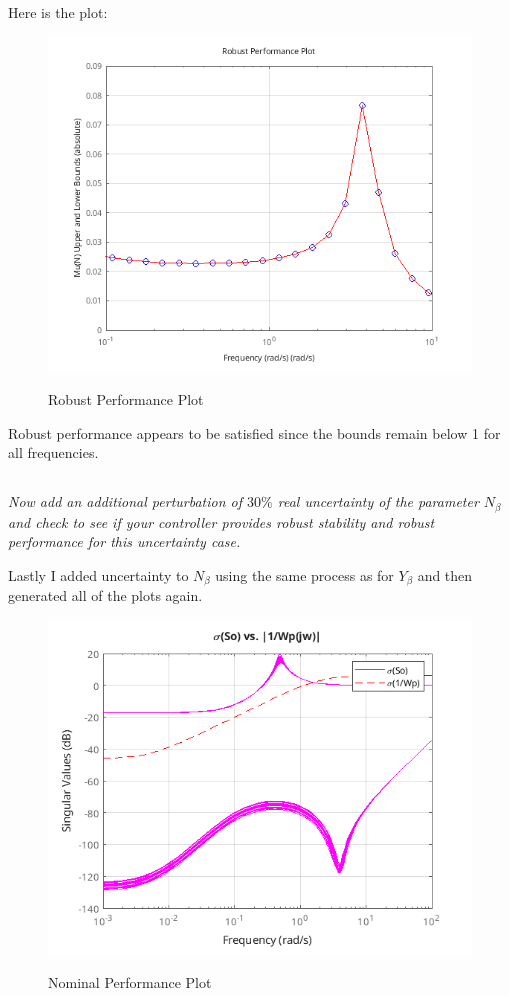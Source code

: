 \documentclass{article}
\begin{document}
Here is the plot:

\begin{figure}[H]
    \centering
    \includegraphics[width=\textwidth]{3rp.png}
    \label{fig:3rp}
    \caption{Robust Performance Plot}
\end{figure}

Robust performance appears to be satisfied since the bounds remain below 1 for all frequencies.

\subsection{}

\textit{Now add an additional perturbation of $30\%$ real uncertainty of the parameter $N_\beta$ and check to see if your controller provides robust stability and robust performance for this uncertainty case.}

Lastly I added uncertainty to $N_\beta$ using the same process as for $Y_\beta$ and then generated all of the plots again.

\begin{figure}[H]
    \centering
    \includegraphics[width=\textwidth]{3nbnp.png}
    \label{fig:3nbnp}
    \caption{Nominal Performance Plot}
\end{figure}
\end{document}
